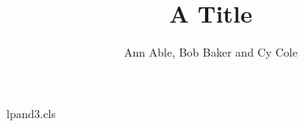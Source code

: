 \begin{filecontents*}[overwrite]{lpand3.cls}
\long\def\affiliations#1{\gdef\@affiliations{#1}}
\let\institute\affiliations
\let\@affiliations\relax
\def\inst#1{\unskip\textsuperscript{#1}}
\def\set@affiliations{\par\parindent=0pt\setcounter{inst}{0}\refstepcounter{inst}%
  \def\and{\par\refstepcounter{inst}\textsuperscript{\theinst}\ignorespaces}%
  \textsuperscript{\theinst}\ignorespaces\@affiliations}
\def\ps@firstpage{\def\@oddhead{}\def\@oddfoot{\vbox to 0pt{\affiliationsbox\vss}}\let\@evenfoot\@oddfoot}
\def\@maketitle{\begin{center}{\LARGE\@title\par}\vskip1em{\large\@author\par}\end{center}\vskip1em}
\renewcommand\maketitle{\par\begingroup\@maketitle\endgroup
  \def\affiliationsbox{\parbox[b]{\textwidth}{\small\set@affiliations}}%
  \thispagestyle{firstpage}}
\end{filecontents*}
\documentclass{lpand3}

\title{A Title}
\author{Ann Able, Bob Baker and Cy Cole}
\maketitle
Text.

